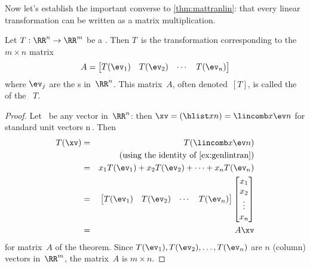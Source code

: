 Now let's establish the important converse to \autoref{thm:mattranlin}: that every linear transformation can be written as a matrix multiplication.

\begin{theorem} \label{thm:matlintran} 
Let \(T:\RR^n\to\RR^m\) be a .
Then \(T\)~is the transformation corresponding to the \(m\times n\)  matrix
\begin{equation*}
A=\begin{bmatrix} T(\ev_1)& T(\ev_2)&\cdots&T(\ev_n) \end{bmatrix}
\end{equation*}
where \(\ev_j\) are the s in~\(\RR^n\).
This matrix~\(A\), often denoted~\([T]\), is called the  of the ~\(T\).
\end{theorem}
\begin{proof} 
Let \xv\ be any vector in~\(\RR^n\): then \(\xv=(\hlist xn)=\lincomb x\ev n\) for standard unit vectors \hlist\ev n\,.
Then
\begin{eqnarray*}
T(\xv)&=&T(\lincomb x\ev n)
\\&&(\text{using the identity of \autoref{ex:genlintran}})
\\&=&x_1T(\ev_1)+x_2T(\ev_2)+\cdots+x_nT(\ev_n)
\\&=&\begin{bmatrix} T(\ev_1)& T(\ev_2)&\cdots&T(\ev_n) \end{bmatrix}
\begin{bmatrix} x_1\\x_2\\\vdots\\x_n \end{bmatrix}
\\&=&A\xv
\end{eqnarray*}
for matrix~\(A\) of the theorem.
Since \(T(\ev_1), T(\ev_2),\ldots,T(\ev_n)\) are \(n\) (column) vectors in~\(\RR^m\), the matrix~\(A\) is \(m\times n\).
\end{proof}


